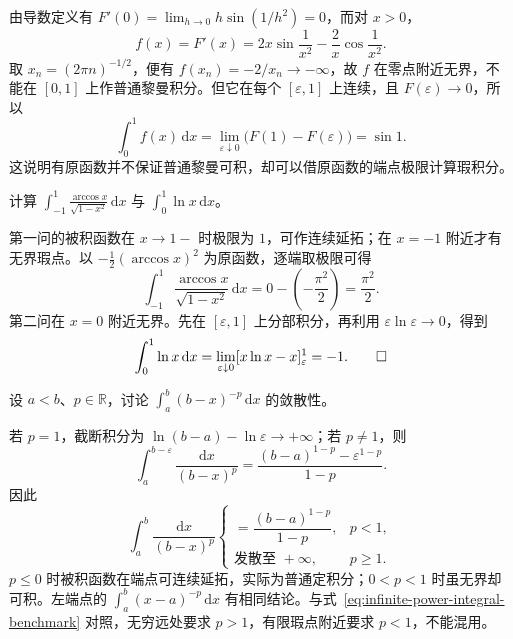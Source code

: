 \documentclass[UTF8,12pt,a4paper,fontset=fandol]{ctexbook}
\begin{document}
\begin{solve}
由导数定义有 $F'(0)=\lim_{h\to0}h\sin(1/h^2)=0$，而对 $x>0$，
\[
    f(x)=F'(x)=2x\sin\frac1{x^2}-\frac2x\cos\frac1{x^2}.
\]
取 $x_n=(2\pi n)^{-1/2}$，便有 $f(x_n)=-2/x_n\to-\infty$，故 $f$ 在零点附近无界，不能在 $[0,1]$ 上作普通黎曼积分。但它在每个 $[\varepsilon,1]$ 上连续，且 $F(\varepsilon)\to0$，所以
\[
    \int_0^1 f(x)\,\mathrm{d}x
    =\lim_{\varepsilon\downarrow0}
        \bigl(F(1)-F(\varepsilon)\bigr)=\sin1.
\]
这说明有原函数并不保证普通黎曼可积，却可以借原函数的端点极限计算瑕积分。
\end{solve}

\begin{example}
\label{ex:singular-arccosine-and-logarithm}
计算 $\int_{-1}^1\frac{\arccos x}{\sqrt{1-x^2}}\,\mathrm{d}x$ 与 $\int_0^1\ln x\,\mathrm{d}x$。
\end{example}

\begin{solve}
第一问的被积函数在 $x\to1-$ 时极限为 $1$，可作连续延拓；在 $x=-1$ 附近才有无界瑕点。以 $-\tfrac12(\arccos x)^2$ 为原函数，逐端取极限可得
\[
    \int_{-1}^1\frac{\arccos x}{\sqrt{1-x^2}}\,\mathrm{d}x
    =0-\left(-\frac{\pi^2}{2}\right)=\frac{\pi^2}{2}.
\]
第二问在 $x=0$ 附近无界。先在 $[\varepsilon,1]$ 上分部积分，再利用 $\varepsilon\ln\varepsilon\to0$，得到
\[
    \int_0^1\ln x\,\mathrm{d}x
    =\lim_{\varepsilon\downarrow0}
        [x\ln x-x]_\varepsilon^1=-1.
    \qedhere
\]
\end{solve}

\begin{example}
\label{ex:singular-power-integral-benchmark}
设 $a<b$、$p\in\mathbb{R}$，讨论 $\int_a^b(b-x)^{-p}\,\mathrm{d}x$ 的敛散性。
\end{example}

\begin{solve}
若 $p=1$，截断积分为 $\ln(b-a)-\ln\varepsilon\to+\infty$；若 $p\neq1$，则
\[
    \int_a^{b-\varepsilon}\frac{\mathrm{d}x}{(b-x)^p}
    =\frac{(b-a)^{1-p}-\varepsilon^{1-p}}{1-p}.
\]
因此
\begin{equation}
    \int_a^b\frac{\mathrm{d}x}{(b-x)^p}
    \begin{cases}
        =\dfrac{(b-a)^{1-p}}{1-p},&p<1,\\
        \text{发散至 }+\infty,&p\geq1.
    \end{cases}
    \label{eq:singular-power-integral-benchmark}
\end{equation}
$p\leq0$ 时被积函数在端点可连续延拓，实际为普通定积分；$0<p<1$ 时虽无界却可积。左端点的 $\int_a^b(x-a)^{-p}\,\mathrm{d}x$ 有相同结论。与式~\eqref{eq:infinite-power-integral-benchmark} 对照，无穷远处要求 $p>1$，有限瑕点附近要求 $p<1$，不能混用。
\end{solve}
\end{document}
